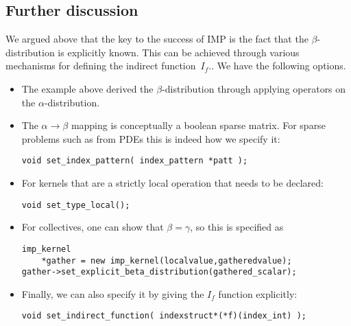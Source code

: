 \subsection{Further discussion}

We argued above that the key to the success of \ac{IMP}
is the fact that the $\beta$-distribution
is explicitly known. This can be achieved through various
mechanisms for defining the indirect function~$I_f$..
We have the following options.
\begin{itemize}
\item The example above derived the $\beta$-distribution through applying
  operators on the $\alpha$-distribution.
\item The $\alpha\rightarrow\beta$ mapping is conceptually a boolean sparse matrix.
  For sparse problems such as from \acp{PDE} this is indeed how we specify it:
\begin{verbatim}
void set_index_pattern( index_pattern *patt );
\end{verbatim}
\item For kernels that are a strictly local operation that needs to be declared:
\begin{verbatim}
void set_type_local();
\end{verbatim}
\item For collectives, one can show that $\beta=\gamma$, so this is specified as
\begin{verbatim}
imp_kernel
    *gather = new imp_kernel(localvalue,gatheredvalue);
gather->set_explicit_beta_distribution(gathered_scalar);
\end{verbatim}
\item Finally, we can also specify it by giving the $I_f$ function explicitly:
\begin{verbatim}
void set_indirect_function( indexstruct*(*f)(index_int) );
\end{verbatim}
\end{itemize}
